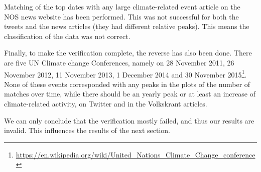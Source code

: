 \documentclass[paper=a4, fontsize=9px]{scrartcl} %
\numberwithin{equation}{section} %
\numberwithin{figure}{section} %
\numberwithin{table}{section} %
\begin{document}
\begin{multicols}{2}
	
%	
%	
%
% 	
% 	
% 	
 
Matching of the top dates with any large climate-related event article on the NOS news website has been performed. This was not successful for both the tweets and the news articles (they had different relative peaks). This means the classification of the data was not correct.

Finally, to make the verification complete, the reverse has also been done. There are five UN Climate change Conferences, namely on 28 November 2011, 26 November 2012, 11 November 2013, 1 December 2014 and 30 November 2015\footnote{\url{https://en.wikipedia.org/wiki/United\_Nations\_Climate\_Change\_conference}}. None of these events corresponded with any peaks in the plots of the number of matches over time, while there should be an yearly peak or at least an increase of climate-related activity, on Twitter and in the Volkskrant articles.

We can only conclude that  the verification mostly failed, and thus our results are invalid. This influences the results of the next section. 



\end{multicols}
\end{document}
